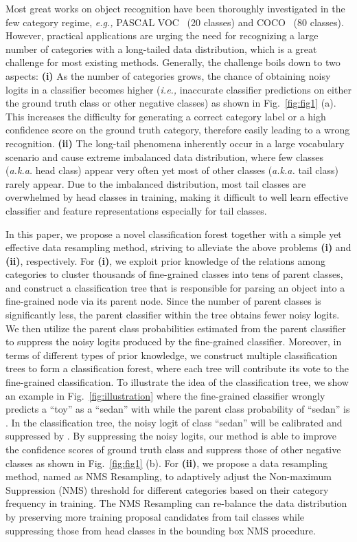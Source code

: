 \documentclass[sigconf]{acmart}
\begin{document}
Most great works on object recognition have been thoroughly investigated in the few category regime, \emph{e.g.,} PASCAL VOC~\cite{pascal_voc} (20 classes) and COCO~\cite{coco} (80 classes). However, practical applications are urging the need for recognizing a large number of categories with a long-tailed data distribution, which is a great challenge for most existing methods. Generally, the challenge boils down to two aspects: \textbf{(i)} As the number of categories grows, the chance of obtaining noisy logits in a classifier becomes higher (\emph{i.e.,} inaccurate classifier predictions on either the ground truth class or other negative classes) as shown in Fig.~\ref{fig:fig1} (a). This increases the difficulty for generating a correct category label or a high confidence score on the ground truth category, therefore easily leading to a wrong recognition. \textbf{(ii)} The long-tail phenomena inherently occur in a large vocabulary scenario and cause extreme imbalanced data distribution, where few classes (\emph{a.k.a.} head class) appear very often yet most of other classes (\emph{a.k.a.} tail class) rarely appear. Due to the imbalanced distribution, most tail classes are overwhelmed by head classes in training, making it difficult to well learn effective classifier and feature representations especially for tail classes.

In this paper, we propose a novel classification forest together with a simple yet effective data resampling method, striving to alleviate the above problems \textbf{(i)} and \textbf{(ii)}, respectively. For \textbf{(i)}, we exploit prior knowledge of the relations among categories to cluster thousands of fine-grained classes into tens of parent classes, and construct a classification tree that is responsible for parsing an object into a fine-grained node via its parent node. Since the number of parent classes is significantly less, the parent classifier within the tree obtains fewer noisy logits. We then utilize the parent class probabilities estimated from the parent classifier to suppress the noisy logits produced by the fine-grained classifier. Moreover, in terms of different types of prior knowledge, we construct multiple classification trees to form a classification forest, where each tree will contribute its vote to the fine-grained classification. To illustrate the idea of the classification tree, we show an example in Fig.~\ref{fig:illustration} where the fine-grained classifier wrongly predicts a ``toy'' as a ``sedan'' with  while the parent class probability of ``sedan'' is . In the classification tree, the noisy logit of class ``sedan'' will be calibrated and suppressed by . By suppressing the noisy logits, our method is able to improve the confidence scores of ground truth class and suppress those of other negative classes as shown in Fig.~\ref{fig:fig1} (b). For \textbf{(ii)}, we propose a data resampling method, named as NMS Resampling, to adaptively adjust the Non-maximum Suppression (NMS) threshold for different categories based on their category frequency in training. The NMS Resampling can re-balance the data distribution by preserving more training proposal candidates from tail classes while suppressing those from head classes in the bounding box NMS procedure.
\end{document}
